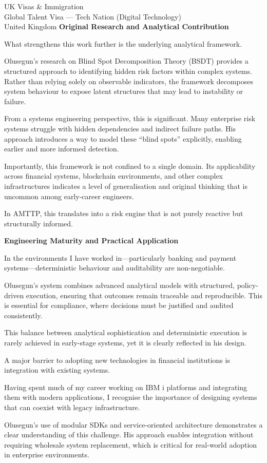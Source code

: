 \documentclass[12pt,a4paper]{letter}
\begin{document}
\begin{letter}{UK Visas \& Immigration\\
Global Talent Visa --- Tech Nation (Digital Technology)\\
United Kingdom}
\textbf{Original Research and Analytical Contribution}

What strengthens this work further is the underlying analytical framework.

Olusegun’s research on Blind Spot Decomposition Theory (BSDT) provides a structured approach to identifying hidden risk factors within complex systems. Rather than relying solely on observable indicators, the framework decomposes system behaviour to expose latent structures that may lead to instability or failure.

From a systems engineering perspective, this is significant. Many enterprise risk systems struggle with hidden dependencies and indirect failure paths. His approach introduces a way to model these “blind spots” explicitly, enabling earlier and more informed detection.

Importantly, this framework is not confined to a single domain. Its applicability across financial systems, blockchain environments, and other complex infrastructures indicates a level of generalisation and original thinking that is uncommon among early-career engineers.

In AMTTP, this translates into a risk engine that is not purely reactive but structurally informed.

\textbf{Engineering Maturity and Practical Application}

In the environments I have worked in—particularly banking and payment systems—deterministic behaviour and auditability are non-negotiable.

Olusegun’s system combines advanced analytical models with structured, policy-driven execution, ensuring that outcomes remain traceable and reproducible. This is essential for compliance, where decisions must be justified and audited consistently.

This balance between analytical sophistication and deterministic execution is rarely achieved in early-stage systems, yet it is clearly reflected in his design.

A major barrier to adopting new technologies in financial institutions is integration with existing systems.

Having spent much of my career working on IBM i platforms and integrating them with modern applications, I recognise the importance of designing systems that can coexist with legacy infrastructure.

Olusegun’s use of modular SDKs and service-oriented architecture demonstrates a clear understanding of this challenge. His approach enables integration without requiring wholesale system replacement, which is critical for real-world adoption in enterprise environments.


\end{letter}
\end{document}
